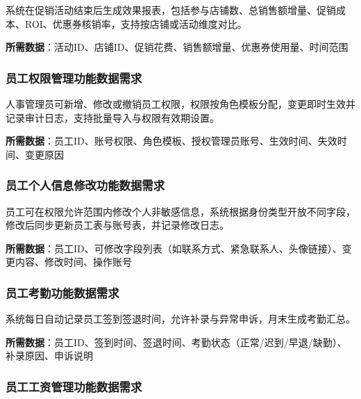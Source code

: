 \documentclass[]{article}
\begin{document}
系统在促销活动结束后生成效果报表，包括参与店铺数、总销售额增量、促销成本、ROI、优惠券核销率，支持按店铺或活动维度对比。

\textbf{所需数据}：活动ID、店铺ID、促销花费、销售额增量、优惠券使用量、时间范围

\hypertarget{ux5458ux5de5ux6743ux9650ux7ba1ux7406ux529fux80fdux6570ux636eux9700ux6c42}{%
  \subsubsection{员工权限管理功能数据需求}\label{ux5458ux5de5ux6743ux9650ux7ba1ux7406ux529fux80fdux6570ux636eux9700ux6c42}}

人事管理员可新增、修改或撤销员工权限，权限按角色模板分配，变更即时生效并记录审计日志，支持批量导入与权限有效期设置。

\textbf{所需数据}：员工ID、账号权限、角色模板、授权管理员账号、生效时间、失效时间、变更原因

\hypertarget{ux5458ux5de5ux4e2aux4ebaux4fe1ux606fux4feeux6539ux529fux80fdux6570ux636eux9700ux6c42}{%
  \subsubsection{员工个人信息修改功能数据需求}\label{ux5458ux5de5ux4e2aux4ebaux4fe1ux606fux4feeux6539ux529fux80fdux6570ux636eux9700ux6c42}}

员工可在权限允许范围内修改个人非敏感信息，系统根据身份类型开放不同字段，修改后同步更新员工表与账号表，并记录修改日志。

\textbf{所需数据}：员工ID、可修改字段列表（如联系方式、紧急联系人、头像链接）、变更内容、修改时间、操作账号

\hypertarget{ux5458ux5de5ux8003ux52e4ux529fux80fdux6570ux636eux9700ux6c42}{%
  \subsubsection{员工考勤功能数据需求}\label{ux5458ux5de5ux8003ux52e4ux529fux80fdux6570ux636eux9700ux6c42}}

系统每日自动记录员工签到签退时间，允许补录与异常申诉，月末生成考勤汇总。

\textbf{所需数据}：员工ID、签到时间、签退时间、考勤状态（正常/迟到/早退/缺勤）、补录原因、申诉说明

\hypertarget{ux5458ux5de5ux5de5ux8d44ux7ba1ux7406ux529fux80fdux6570ux636eux9700ux6c42}{%
  \subsubsection{员工工资管理功能数据需求}\label{ux5458ux5de5ux5de5ux8d44ux7ba1ux7406ux529fux80fdux6570ux636eux9700ux6c42}}
\end{document}
